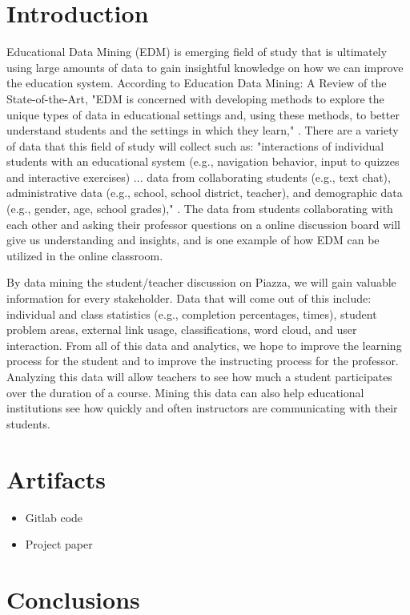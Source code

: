 \documentclass{sig-alternate}
\begin{document}
\section{Introduction}
Educational Data Mining (EDM) is emerging field of study that is ultimately using large amounts of data to gain insightful knowledge on how we can improve the education system. According to Education Data Mining: A Review of the State-of-the-Art, "EDM is concerned with developing methods to explore the unique types of data in educational settings and, using these methods, to better understand students and the settings in which they learn," \cite{review}. There are a variety of data that this field of study will collect such as: "interactions of individual students with an educational system (e.g., navigation behavior, input to quizzes and interactive exercises) ... data from collaborating students (e.g., text chat), administrative data (e.g., school, school district, teacher), and demographic data (e.g., gender, age, school grades)," \cite{EDM}. The data from students collaborating with each other and asking their professor questions on a online discussion board will give us understanding and insights, and is one example of how EDM can be utilized in the online classroom. 

By data mining the student/teacher discussion on Piazza, we will gain valuable information for every stakeholder. Data that will come out of this include: individual and class statistics (e.g., completion percentages, times), student problem areas, external link usage, classifications, word cloud, and user interaction. From all of this data and analytics, we hope to improve the learning process for the student and to improve the instructing process for the professor. Analyzing this data will allow teachers to see how much a student participates over the duration of a course. Mining this data can also help educational institutions see how quickly and often instructors are communicating with their students. 


\section{Artifacts}
\begin{itemize}
    \item Gitlab code
    \item Project paper
\end{itemize}



\section{Conclusions}


%

%
%
\end{document}
